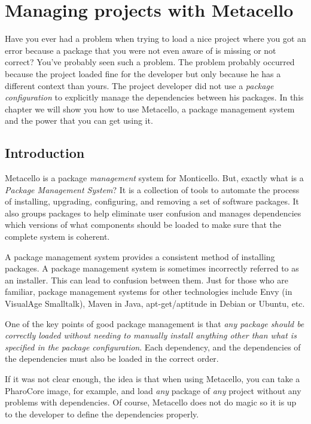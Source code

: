 \documentclass[a4paper,10pt,twoside]{book}
\begin{document}

\chapter{Managing projects with Metacello}


Have you ever had a problem when trying to load a nice project where you got an error because a package that you were not even aware of  is missing or not correct? You've probably seen such a problem. The problem probably occurred because the project loaded fine for the  developer but only because he has a different context than yours. The project developer did not use a \emph{package configuration} to explicitly manage the dependencies between his packages. In this chapter we will show you how to use Metacello, a package management system and the power that you can get using it. 

\section{Introduction}

Metacello is a package \textit{management} system for Monticello. But, exactly what is a \textit{Package Management System}?
It is a collection of tools to automate the process of installing, upgrading, configuring, and removing a set of software packages. It also groups packages to help eliminate user confusion and manages dependencies \ie which versions of what components should be loaded to make sure that the complete system is coherent. 

A package management system provides a consistent method of installing packages. A package management system is sometimes incorrectly referred to as an installer. This can lead to confusion between them. Just for those who are familiar, package management systems for other technologies include Envy (in VisualAge Smalltalk), Maven in Java, apt-get/aptitude in Debian or Ubuntu, etc.

One of the key points of good package management is that \emph{any package should be correctly loaded without needing to manually install anything other than what is specified in the package configuration}. Each dependency, and the dependencies of the dependencies must also be loaded in the correct order. 

If it was not clear enough, the idea is that when using Metacello, you can take a PharoCore image, for example, and load {\em any} package of {\em any} project without any problems with dependencies. Of course, Metacello does not do magic so it is up to the developer  to define the dependencies properly.
\end{document}
